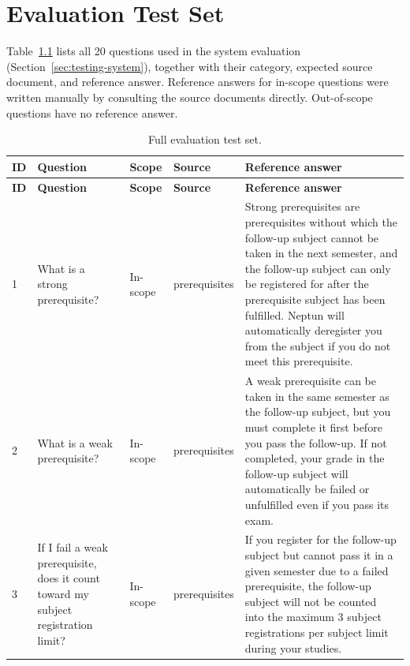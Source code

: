 \chapter{Evaluation Test Set}
\label{app:testset}

Table~\ref{tab:testset} lists all 20 questions used in the system evaluation
(Section~\ref{sec:testing-system}), together with their category, expected
source document, and reference answer. Reference answers for in-scope questions
were written manually by consulting the source documents directly. Out-of-scope
questions have no reference answer.

\begin{longtable}{|p{}|p{}|p{}|p{}|p{}|}
    \caption{Full evaluation test set.}
    \label{tab:testset} \\
    \hline
    \textbf{ID} & \textbf{Question} & \textbf{Scope} & \textbf{Source} & \textbf{Reference answer} \\
    \hline\hline
    \endfirsthead
    \hline
    \textbf{ID} & \textbf{Question} & \textbf{Scope} & \textbf{Source} & \textbf{Reference answer} \\
    \hline\hline
    \endhead
    \hline
    \endfoot

    1 &
    What is a strong prerequisite? &
    In-scope &
    prerequisites &
    Strong prerequisites are prerequisites without which the follow-up subject cannot be taken in the next semester, and the follow-up subject can only be registered for after the prerequisite subject has been fulfilled. Neptun will automatically deregister you from the subject if you do not meet this prerequisite. \\
    \hline

    2 &
    What is a weak prerequisite? &
    In-scope &
    prerequisites &
    A weak prerequisite can be taken in the same semester as the follow-up subject, but you must complete it first before you pass the follow-up. If not completed, your grade in the follow-up subject will automatically be failed or unfulfilled even if you pass its exam. \\
    \hline

    3 &
    If I fail a weak prerequisite, does it count toward my subject registration limit? &
    In-scope &
    prerequisites &
    If you register for the follow-up subject but cannot pass it in a given semester due to a failed prerequisite, the follow-up subject will not be counted into the maximum 3 subject registrations per subject limit during your studies. \\
    \hline


\end{longtable}
